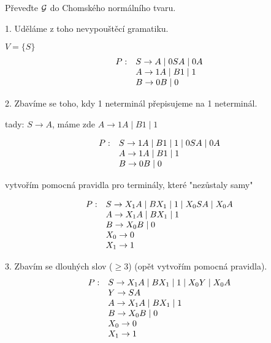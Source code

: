 Převeďte $\mathcal{G}$ do Chomského normálního tvaru. 

1. Uděláme z toho nevypouštěcí gramatiku. 

$V = \{S\}$\\ 
\[
\begin{array}{l l}
    P: & S \rightarrow A \mid 0SA \mid 0A \\
       & A \rightarrow 1A \mid B1 \mid 1 \\
       & B \rightarrow 0B \mid 0 \\
\end{array}
\]

2. Zbavíme se toho, kdy 1 neterminál přepisujeme na 1 neterminál. 

tady: $S \rightarrow A$, máme zde $A \rightarrow 1A \mid B1 \mid 1$ 

\[
\begin{array}{l l}
    P: & S \rightarrow 1A \mid B1 \mid 1 \mid 0SA \mid 0A \\
       & A \rightarrow 1A \mid B1 \mid 1 \\
       & B \rightarrow 0B \mid 0 \\
\end{array}
\]

vytvořím pomocná pravidla pro terminály, které "nezůstaly samy" 

\[
\begin{array}{l l}
    P: & S \rightarrow X_1A \mid BX_1 \mid 1 \mid X_0SA \mid X_0A \\
       & A \rightarrow X_1A \mid BX_1 \mid 1 \\
       & B \rightarrow X_0B \mid 0 \\
       & X_0 \rightarrow 0\\
       & X_1 \rightarrow 1\\
\end{array}
\]

3. Zbavím se dlouhých slov ($\geq 3$) (opět vytvořím pomocná pravidla). 
\[
\begin{array}{l l}
    P: & S \rightarrow X_1A \mid BX_1 \mid 1 \mid X_0Y \mid X_0A \\
       & Y \rightarrow SA \\
       & A \rightarrow X_1A \mid BX_1 \mid 1 \\
       & B \rightarrow X_0B \mid 0 \\
       & X_0 \rightarrow 0\\
       & X_1 \rightarrow 1\\
\end{array}
\]

